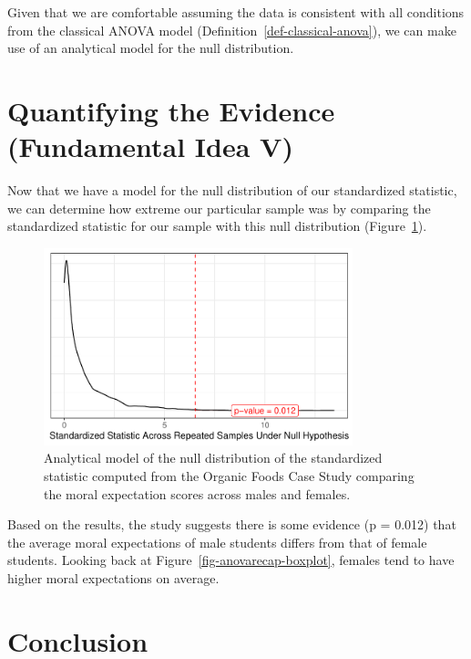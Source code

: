 \documentclass[
  letterpaper,
  DIV=11,
  numbers=noendperiod]{scrreprt}
\theoremstyle{plain}
\theoremstyle{definition}
\theoremstyle{definition}
\theoremstyle{remark}
\begin{document}
Given that we are comfortable assuming the data is consistent with all
conditions from the classical ANOVA model
(Definition~\ref{def-classical-anova}), we can make use of an analytical
model for the null distribution.

\hypertarget{quantifying-the-evidence-fundamental-idea-v-1}{%
\section{Quantifying the Evidence (Fundamental Idea
V)}\label{quantifying-the-evidence-fundamental-idea-v-1}}

Now that we have a model for the null distribution of our standardized
statistic, we can determine how extreme our particular sample was by
comparing the standardized statistic for our sample with this null
distribution (Figure~\ref{fig-anovarecap-null-distribution}).

\begin{figure}

{\centering \includegraphics[width=0.8\textwidth,height=\textheight]{./images/fig-anovarecap-null-distribution-1.pdf}

}

\caption{\label{fig-anovarecap-null-distribution}Analytical model of the
null distribution of the standardized statistic computed from the
Organic Foods Case Study comparing the moral expectation scores across
males and females.}

\end{figure}

Based on the results, the study suggests there is some evidence (p =
0.012) that the average moral expectations of male students differs from
that of female students. Looking back at
Figure~\ref{fig-anovarecap-boxplot}, females tend to have higher moral
expectations on average.

\hypertarget{conclusion}{%
\section{Conclusion}\label{conclusion}}
\end{document}
